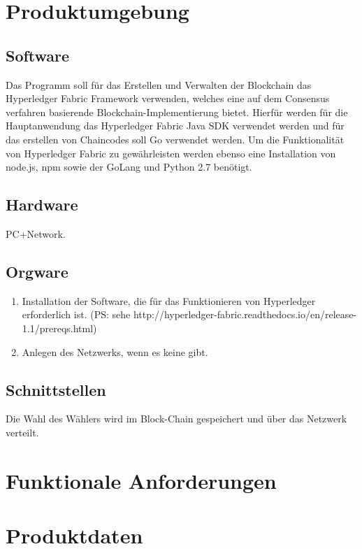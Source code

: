 \documentclass[parskip=full,11pt,twoside]{scrartcl}
\begin{document}
\section{Produktumgebung}

\subsection{Software}
Das Programm soll für das Erstellen und Verwalten der Blockchain das Hyperledger Fabric Framework verwenden, welches eine auf dem Consensus verfahren basierende Blockchain-Implementierung bietet.
Hierfür werden für die Hauptanwendung das Hyperledger Fabric Java SDK verwendet werden und für  das erstellen von Chaincodes soll Go verwendet werden.
Um die Funktionalität von Hyperledger Fabric zu gewährleisten werden ebenso eine Installation von node.js, npm sowie der GoLang und Python 2.7 benötigt.

\subsection{Hardware}
PC+Network.

\subsection{Orgware}
\begin{enumerate}
\item Installation der Software, die für das Funktionieren von Hyperledger erforderlich ist. (PS: sehe http://hyperledger-fabric.readthedocs.io/en/release-1.1/prereqs.html)
\item Anlegen des Netzwerks, wenn es keine gibt.
\end{enumerate}

\subsection{Schnittstellen}
Die Wahl des Wählers wird im Block-Chain gespeichert und über das Netzwerk verteilt.

\section{Funktionale Anforderungen}




\section{Produktdaten}
\end{document}
